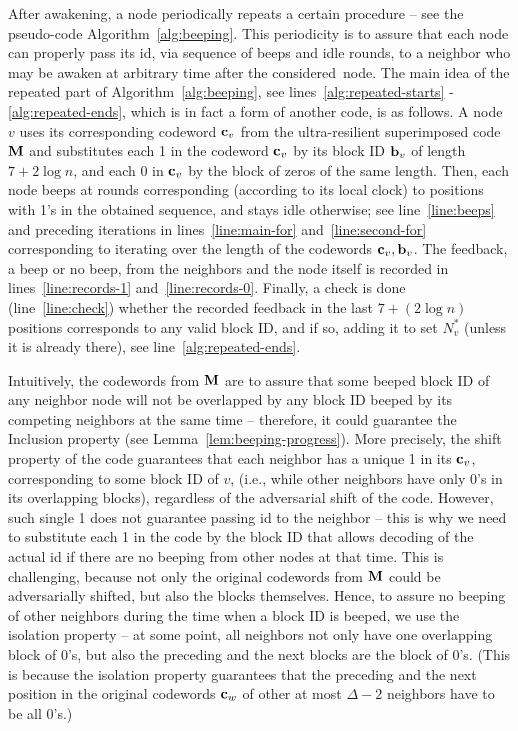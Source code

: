 \documentclass[11pt]{article}
\begin{document}
After awakening, a node periodically repeats a certain procedure -- see the pseudo-code Algorithm~\ref{alg:beeping}.
This periodicity is to assure that each node can properly pass its id, via sequence of beeps and idle rounds, to a neighbor who may be awaken at arbitrary time after the considered~node.
The main idea of the repeated part of Algorithm~\ref{alg:beeping}, see lines~\ref{alg:repeated-starts} - \ref{alg:repeated-ends}, which is in fact a form of another code, is as follows. A node $v$ uses its corresponding codeword ${\mathbf c}_v$ from the ultra-resilient superimposed code ${\mathbf M}$ and substitutes each 1 in the codeword ${\mathbf c}_v$ 
by its block ID ${\mathbf b}_v$
of length $7+2\log n$,
and each 0 in ${\mathbf c}_v$ by the block of zeros of the same length.
Then, each node beeps at rounds corresponding (according to its local clock) to positions with 1's in the obtained sequence, and stays idle 
otherwise; see line~\ref{line:beeps} and preceding iterations in lines~\ref{line:main-for} and~\ref{line:second-for} corresponding to iterating over the length of the codewords ${\mathbf c}_v,{\mathbf b}_v$. 
The feedback, a beep or no beep, from the neighbors and the node itself is recorded in lines~\ref{line:records-1} and~\ref{line:records-0}.
Finally, a check is done (line~\ref{line:check}) whether the recorded feedback in the last $7+(2\log n)$ positions corresponds to any valid block ID, and if so, adding it to set $N^*_v$ (unless it is already there), see line~\ref{alg:repeated-ends}.



Intuitively, the codewords from ${\mathbf M}$ are to assure that some beeped block ID of any neighbor node will not be overlapped by any block ID beeped by its competing neighbors at the same time -- therefore, it could guarantee the 
Inclusion property (see Lemma~\ref{lem:beeping-progress}).
More precisely, the shift property of the code guarantees that each neighbor has a unique 1 in its ${\mathbf c}_v$, corresponding to some block ID of $v$, (i.e., while other neighbors have only 0's in its overlapping blocks), regardless of the adversarial shift of the code. However, such single 1 does not guarantee passing id to the neighbor -- this is why we need to substitute each 1 in the code by the block ID that allows decoding of the actual id if there are no beeping from other nodes at that time. This is challenging, because not only the original codewords from ${\mathbf M}$ could be adversarially shifted, but also the blocks themselves. Hence, to assure no beeping of other neighbors during the time when a block ID is beeped, we use 
{the isolation property}
-- at some point, all neighbors not only have one overlapping block of 0's, but also the preceding and 
the next blocks are the block of 0's. 
(This is because 
{the isolation property}
guarantees that the preceding and the next position in the original codewords ${\mathbf c}_w$ of other at most $\Delta-2$ neighbors have to be all 0's.)  
\end{document}
